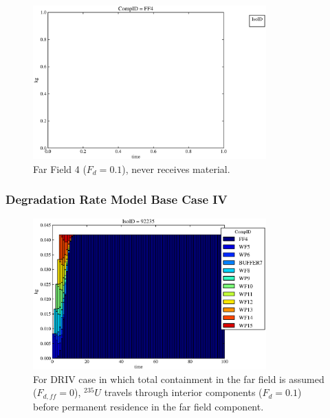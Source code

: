 \begin{frame}
\begin{figure}
\begin{minipage}[b]{0.45\linewidth}
  \includegraphics[width=0.8\textwidth]{./images/drIII0.eps}
  \caption[Case DRIII WP Contaminants.]{ 
    Far Field 4 ($F_d = 0.1$), never receives material.
    }
  \label{fig:drIIIff0}


  \end{minipage}
\end{figure}
\end{frame}


\begin{frame}[ctb!]
  \frametitle{Degradation Rate Model Base Case IV}

\begin{figure}[ht]
\centering
\includegraphics[width=0.8\textwidth]{./images/drIV.eps}
\caption[$^{235}U$ residence. Degradation Rate Buffer No Release.]{
For DRIV case in which total containment in the far field is assumed ($F_{d,ff}=0$), 
$^{235}U$ travels through interior components ($F_d = 0.1$) before 
permanent residence in the far field component.
}
\label{fig:drIVall}
\end{figure}
\end{frame}

